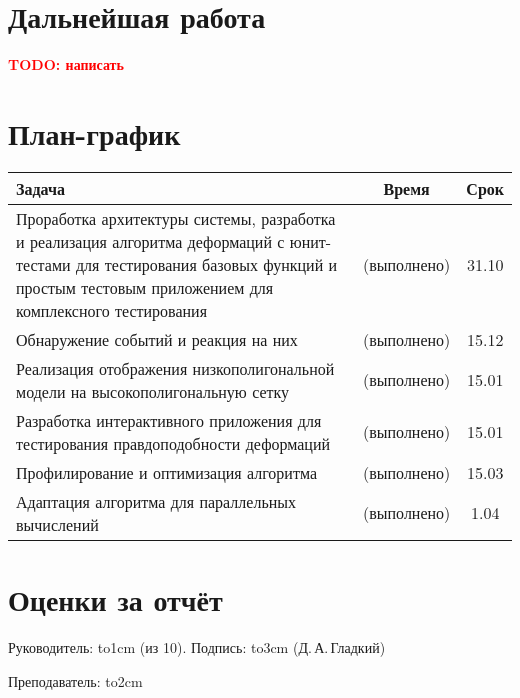 \documentclass[a4paper, 14pt, titlepage]{extarticle}
\newcommand{\underscore}[1]{\hbox to#1{\hrulefill}}
\newcommand{\todo}[1]{\textbf{\textcolor{red}{TODO: #1}}}
\let\oldsection\section
\renewcommand{\section}{\newpage\oldsection}
\begin{document}
  \section{Дальнейшая работа}

    \todo{написать}

  \section{План-график}

    \begin{center}
      \begin{tabular}{|p{10.3cm}|c|c|}\hline
        Задача                                       & Время         & Срок  \\\hline\hline
        Проработка архитектуры системы, разработка и реализация алгоритма деформаций
        с юнит-тестами для тестирования базовых функций и простым тестовым приложением
        для комплексного тестирования                & (выполнено)   & 31.10 \\\hline
        Обнаружение событий и реакция на них         & (выполнено)   & 15.12 \\\hline
        Реализация отображения низкополигональной
        модели на высокополигональную сетку          & (выполнено)   & 15.01 \\\hline
        Разработка интерактивного приложения для
        тестирования правдоподобности деформаций     & (выполнено)   & 15.01 \\\hline
        Профилирование и оптимизация алгоритма       & (выполнено)   & 15.03 \\\hline
        Адаптация алгоритма для параллельных
        вычислений                                   & (выполнено)   & 1.04 \\\hline
      \end{tabular}
    \end{center}

  \section{Оценки за отчёт}

    Руководитель: \underscore{1cm} (из 10). Подпись: \underscore{3cm} (Д.\,А.\,Гладкий)

    \vspace{0.5cm}
    Преподаватель: \underscore{2cm}


  \begin{flushleft}
    
  \end{flushleft}
\end{document}
